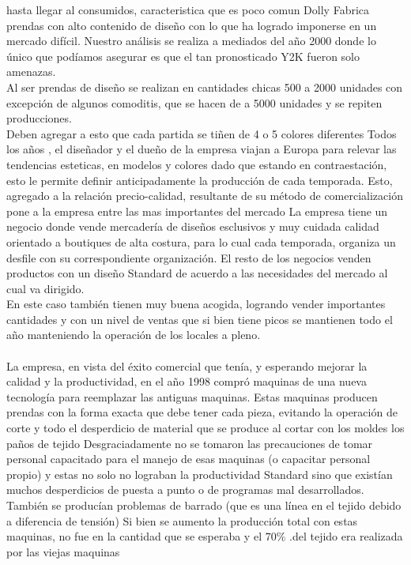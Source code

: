 \documentclass[a4paper,10pt,titlepage]{article}
\begin{document}
hasta llegar al consumidos, caracteristica que es poco comun
Dolly Fabrica prendas con alto contenido de diseño con lo que ha logrado
imponerse en un mercado difícil. Nuestro análisis se realiza a mediados del año
2000 donde lo único que podíamos asegurar es que el tan pronosticado Y2K
fueron solo amenazas.\\
Al ser prendas de diseño se realizan en cantidades chicas 500 a 2000 unidades
con excepción de algunos comoditis, que se hacen de a 5000 unidades y se
repiten producciones.\\
Deben agregar a esto que cada partida se tiñen de 4 o 5 colores diferentes
Todos los años , el diseñador y el dueño de la empresa viajan a Europa para
relevar las tendencias esteticas, en modelos y colores dado que estando en
contraestación, esto le permite definir anticipadamente la producción de cada
temporada. Esto, agregado a la relación precio-calidad, resultante de su método
de comercialización pone a la empresa entre las mas importantes del mercado
La empresa tiene un negocio donde vende mercadería de diseños esclusivos y
muy cuidada calidad orientado a boutiques de alta costura, para lo cual cada
temporada, organiza un desfile con su correspondiente organización. El resto de
los negocios venden productos con un diseño Standard de acuerdo a las
necesidades del mercado al cual va dirigido.\\
En este caso también tienen muy buena acogida, logrando vender importantes
cantidades y con un nivel de ventas que si bien tiene picos se mantienen todo el
año manteniendo la operación de los locales a pleno.\\ \\
La empresa, en vista del éxito comercial que tenía, y esperando mejorar la calidad
y la productividad, en el año 1998 compró maquinas de una nueva tecnología para
reemplazar las antiguas maquinas. Estas maquinas producen prendas con la forma
exacta que debe tener cada pieza, evitando la operación de corte y todo el
desperdicio de material que se produce al cortar con los moldes los paños de tejido
Desgraciadamente no se tomaron las precauciones de tomar personal capacitado
para el manejo de esas maquinas (o capacitar personal propio) y estas no solo no
lograban la productividad Standard sino que existían muchos desperdicios de
puesta a punto o de programas mal desarrollados. También se producían
problemas de barrado (que es una línea en el tejido debido a diferencia de tensión)
Si bien se aumento la producción total con estas maquinas, no fue en la cantidad
que se esperaba y el 70\% .del tejido era realizada por las viejas maquinas
\end{document}
